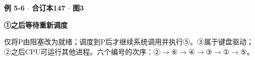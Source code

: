 {\color{ink}\bfseries 例 5-6 \(\cdot \) 合订本147 \(\cdot \) 图3}\par \textbf{{\symfont ①}之后等待重新调度}\par\vspace{2bp}{\symfont ①}仅将P由阻塞改为就绪；调度到P后才继续系统调用并执行{\symfont ⑤}。{\symfont ③}属于键盘驱动；{\symfont ②}之后CPU可运行其他进程。六个编号的次序：{\symfont ②}\(\to \){\symfont ⑥}\(\to \){\symfont ④}\(\to \){\symfont ③}\(\to \){\symfont ①}\(\to \){\symfont ⑤}。
